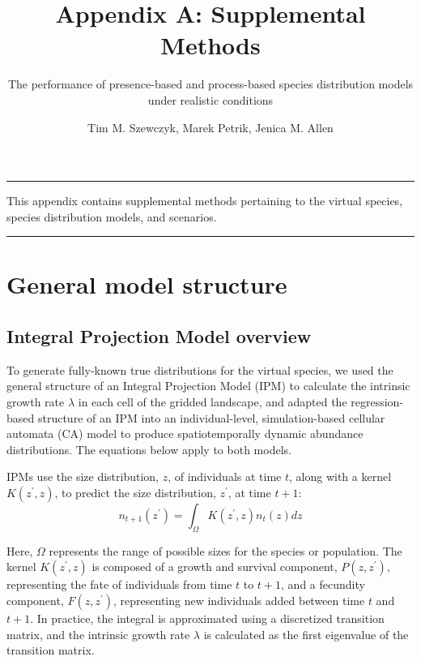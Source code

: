 \documentclass[]{article}
\title{Appendix A: Supplemental Methods}
\subtitle{The performance of presence-based and process-based species distribution
models under realistic conditions}
\author{Tim M. Szewczyk, Marek Petrik, Jenica M. Allen}
\date{}
\begin{document}
\maketitle

{
\setcounter{tocdepth}{1}
\tableofcontents
}
\setcounter{table}{0}  \renewcommand{\thetable}{A.\arabic{table}} \setcounter{figure}{0} \renewcommand{\thefigure}{A.\arabic{figure}}

\begin{center}\rule{0.5\linewidth}{\linethickness}\end{center}

This appendix contains supplemental methods pertaining to the virtual
species, species distribution models, and scenarios.

\begin{center}\rule{0.5\linewidth}{\linethickness}\end{center}

\section{General model structure}
\subsection{Integral Projection Model overview}

To generate fully-known true distributions for the virtual species, we
used the general structure of an Integral Projection Model (IPM) to
calculate the intrinsic growth rate \(\lambda\) in each cell of the
gridded landscape, and adapted the regression-based structure of an IPM
into an individual-level, simulation-based cellular automata (CA) model
to produce spatiotemporally dynamic abundance distributions. The
equations below apply to both models.

IPMs use the size distribution, \(z\), of individuals at time \(t\),
along with a kernel \(K(z^{\prime}, z)\), to predict the size
distribution, \(z^{\prime}\), at time \(t+1\): \begin{equation}
n_{t+1}(z^{\prime}) = \int_{\Omega} K(z^{\prime}, z) n_t(z) dz
\end{equation}

Here, \(\Omega\) represents the range of possible sizes for the species
or population. The kernel \(K(z^{\prime}, z)\) is composed of a growth
and survival component, \(P(z, z^{\prime})\), representing the fate of
individuals from time \(t\) to \(t+1\), and a fecundity component,
\(F(z, z^{\prime})\), representing new individuals added between time
\(t\) and \(t+1\). In practice, the integral is approximated using a
discretized transition matrix, and the intrinsic growth rate \(\lambda\)
is calculated as the first eigenvalue of the transition matrix.
\end{document}

